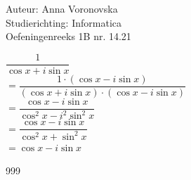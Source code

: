 \documentclass[a4paper]{article}
\begin{document}
  
\noindent \large Auteur: Anna Voronovska \\
\noindent \large Studierichting: Informatica\\
\noindent \large Oefeningenreeks 1B nr. 14.21\\

\medskip

\normalsize


$\dfrac{1}{\cos x + i\sin x}$\\

$=\dfrac{1 \cdot (\cos x - i\sin x)}{(\cos x + i\sin x)\cdot (\cos x - i\sin x)}$\\

$=\dfrac{\cos x - i\sin x}{\cos^2 x - i^2 \sin^2 x}$\\

$=\dfrac{\cos x - i\sin x}{\cos^2 x + \sin^2 x}$\\

$=\cos x - i\sin x$


\begin{thebibliography}{999}
\end{thebibliography}
\end{document}
